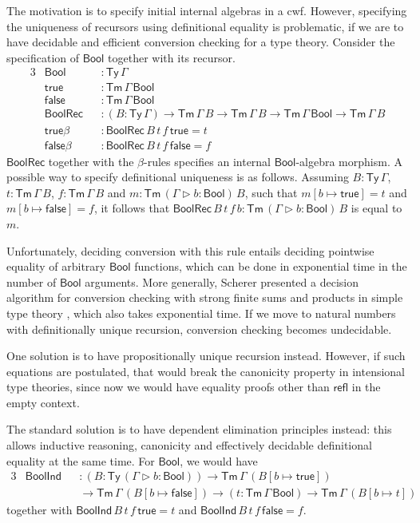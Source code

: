 \documentclass[12pt,a4paper,twoside,openany]{book}
\theoremstyle{remark}
\theoremstyle{definition}
\newcommand{\ms}[1]{\mathsf{#1}}
\newcommand{\refl}{\mathsf{refl}}
\newcommand{\Tm}{\mathsf{Tm}}
\newcommand{\Ty}{\mathsf{Ty}}
\newcommand{\ext}{\triangleright}
\newcommand{\Bool}{\ms{Bool}}
\newcommand{\true}{\ms{true}}
\newcommand{\false}{\ms{false}}
\begin{document}
The motivation is to specify initial internal algebras in a cwf. However,
specifying the uniqueness of recursors using definitional equality is
problematic, if we are to have decidable and efficient conversion checking for a
type theory. Consider the specification of $\Bool$ together with its recursor.
\begin{alignat*}{3}
  & \Bool  &&: \Ty\,\Gamma \\
  & \true  &&: \Tm\,\Gamma\,\Bool \\
  & \false &&: \Tm\,\Gamma\,\Bool \\
  & \ms{BoolRec} &&: (B : \Ty\,\Gamma)\to \Tm\,\Gamma\,B \to \Tm\,\Gamma\,B \to \Tm\,\Gamma\,\Bool \to \Tm\,\Gamma\,B\\
  & \true\beta &&: \ms{BoolRec}\,B\,t\,f\,\true = t\\
  & \false\beta &&: \ms{BoolRec}\,B\,t\,f\,\false = f
\end{alignat*}
$\ms{BoolRec}$ together with the $\beta$-rules specifies an internal
$\Bool$-algebra morphism. A possible way to specify definitional uniqueness is
as follows. Assuming $B : \Ty\,\Gamma$, $t : \Tm\,\Gamma\,B$, $f :
\Tm\,\Gamma\,B$ and $m : \Tm\,(\Gamma\ext b : \Bool)\,B$, such that $m[b \mapsto
  \true] = t$ and $m[b \mapsto \false] = f$, it follows that
$\ms{BoolRec}\,B\,t\,f\,b : \Tm\,(\Gamma\ext b : \Bool)\,B$ is equal to $m$.

Unfortunately, deciding conversion with this rule entails deciding pointwise
equality of arbitrary $\Bool$ functions, which can be done in exponential time
in the number of $\Bool$ arguments. More generally, Scherer presented a decision
algorithm for conversion checking with strong finite sums and products in simple
type theory \cite{scherer17deciding}, which also takes exponential time. If we
move to natural numbers with definitionally unique recursion, conversion
checking becomes undecidable.

One solution is to have propositionally unique recursion instead. However, if
such equations are postulated, that would break the canonicity property in
intensional type theories, since now we would have equality proofs other than
$\refl$ in the empty context.

The standard solution is to have dependent elimination principles instead: this
allows inductive reasoning, canonicity and effectively decidable definitional
equality at the same time. For $\Bool$, we would have
\begin{alignat*}{3}
  & \ms{BoolInd} &&: (B : \Ty\,(\Gamma\ext b : \Bool)) \to \Tm\,\Gamma\,(B[b \mapsto \true])\\
  & &&\to \Tm\,\Gamma\,(B[b \mapsto \false]) \to (t : \Tm\,\Gamma\,\Bool) \to \Tm\,\Gamma\,(B[b \mapsto t])
\end{alignat*}
together with $\ms{BoolInd}\,B\,t\,f\,\true = t$ and $\ms{BoolInd}\,B\,t\,f\,\false = f$.
\end{document}
